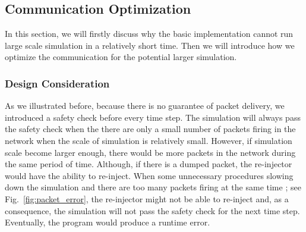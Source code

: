 \subsection{Communication Optimization} \label{sec:co}
In this section, we will firstly discuss why the basic implementation cannot run large scale simulation in a relatively short time. Then we will introduce how we optimize the communication for the potential larger simulation.\\
\subsubsection{Design Consideration}
As we illustrated before, because there is no guarantee of packet delivery, we introduced a safety check before every time step. The simulation will always pass the safety check when the there are only a small number of packets firing in the network when the scale of simulation is relatively small. However, if simulation scale become larger enough, there would be more packets in the network during the same period of time. Although, if there is a dumped packet, the re-injector would have the ability to re-inject. When some unnecessary procedures slowing down the simulation and there are too many packets firing at the same time ; see Fig.~\ref{fig:packet_error}, the re-injector might not be able to re-inject and, as a consequence, the simulation will not pass the safety check for the next time step. Eventually, the program would produce a runtime error.\\

